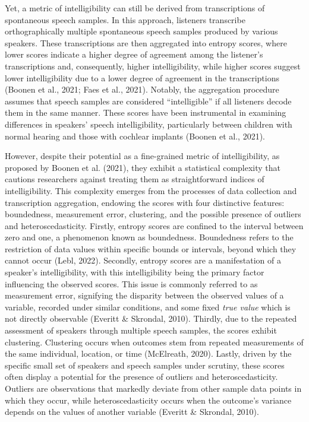 \documentclass[
]{agujournal2019}
\begin{document}
Yet, a metric of intelligibility can still be derived from
transcriptions of spontaneous speech samples. In this approach,
listeners transcribe orthographically multiple spontaneous speech
samples produced by various speakers. These transcriptions are then
aggregated into entropy scores, where lower scores indicate a higher
degree of agreement among the listener's transcriptions and,
consequently, higher intelligibility, while higher scores suggest lower
intelligibility due to a lower degree of agreement in the transcriptions
(Boonen et al., 2021; Faes et al., 2021). Notably, the aggregation
procedure assumes that speech samples are considered ``intelligible'' if
all listeners decode them in the same manner. These scores have been
instrumental in examining differences in speakers' speech
intelligibility, particularly between children with normal hearing and
those with cochlear implants (Boonen et al., 2021).

However, despite their potential as a fine-grained metric of
intelligibility, as proposed by Boonen et al. (2021), they exhibit a
statistical complexity that cautions researchers against treating them
as straightforward indices of intelligibility. This complexity emerges
from the processes of data collection and transcription aggregation,
endowing the scores with four distinctive features: boundedness,
measurement error, clustering, and the possible presence of outliers and
heteroscedasticity. Firstly, entropy scores are confined to the interval
between zero and one, a phenomenon known as boundedness. Boundedness
refers to the restriction of data values within specific bounds or
intervals, beyond which they cannot occur (Lebl, 2022). Secondly,
entropy scores are a manifestation of a speaker's intelligibility, with
this intelligibility being the primary factor influencing the observed
scores. This issue is commonly referred to as measurement error,
signifying the disparity between the observed values of a variable,
recorded under similar conditions, and some fixed \emph{true value}
which is not directly observable (Everitt \& Skrondal, 2010). Thirdly,
due to the repeated assessment of speakers through multiple speech
samples, the scores exhibit clustering. Clustering occurs when outcomes
stem from repeated measurements of the same individual, location, or
time (McElreath, 2020). Lastly, driven by the specific small set of
speakers and speech samples under scrutiny, these scores often display a
potential for the presence of outliers and heteroscedasticity. Outliers
are observations that markedly deviate from other sample data points in
which they occur, while heteroscedasticity occurs when the outcome's
variance depends on the values of another variable (Everitt \& Skrondal,
2010).
\end{document}

